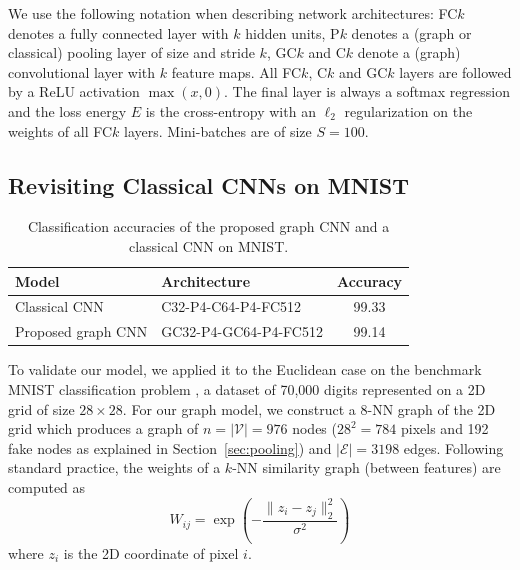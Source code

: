 \documentclass{article}
\newcommand{\V}{\mathcal{V}}
\newcommand{\E}{\mathcal{E}}
\newcommand{\secref}[1]{Section~\ref{sec:#1}}
\begin{document}
We use the following notation when describing network architectures: FC$k$
denotes a fully connected layer with $k$ hidden units, P$k$ denotes a (graph or
classical) pooling layer of size and stride $k$, GC$k$ and C$k$ denote a
(graph) convolutional layer with $k$ feature maps.
All FC$k$, C$k$ and GC$k$ layers are followed by a ReLU activation $\max(x,0)$.
The final layer is always a softmax regression and the loss energy $E$ is the
cross-entropy with an $\ell_2$ regularization on the weights of all FC$k$
layers. Mini-batches are of size $S = 100$.


\subsection{Revisiting Classical CNNs on MNIST} \label{sec:MNIST}

\begin{table}[t]
\centering
\begin{tabular}{llc}
\toprule
Model & Architecture & Accuracy \\
\midrule
Classical CNN & C32-P4-C64-P4-FC512 & 99.33  \\
Proposed graph CNN & GC32-P4-GC64-P4-FC512 & 99.14  \\
\bottomrule
\end{tabular}
\caption{Classification accuracies of the proposed graph CNN and a classical
CNN on MNIST.} 
\label{tab:mnist}
\end{table}

To validate our model, we applied it to the Euclidean case on the benchmark
MNIST classification problem \cite{pro:LeCunBottouBengioHaffner98MNIST}, a
dataset of 70,000 digits represented on a 2D grid of size $28 \times 28$. For
our graph model, we construct a $8$-NN graph of the 2D grid which produces a
graph of $n = |\V| = 976$ nodes ($28^2 = 784$ pixels and 192 fake nodes as
explained in \secref{pooling}) and $|\E| = 3198$ edges. Following standard
practice, the weights of a $k$-NN similarity graph (between features) are
computed as
\begin{equation} \label{eq:knngraph}
	W_{ij} = \exp \left( -\frac{\|z_i - z_j\|_2^2}{\sigma^2} \right)
\end{equation}
where $z_i$ is the 2D coordinate of pixel $i$.
\end{document}

